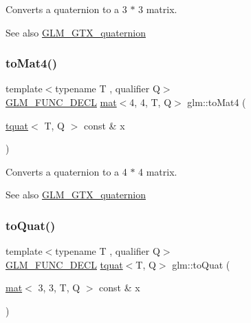 Converts a quaternion to a 3 $\ast$ 3 matrix.

\begin{DoxySeeAlso}{See also}
\hyperlink{group__gtx__quaternion}{G\+L\+M\+\_\+\+G\+T\+X\+\_\+quaternion} 
\end{DoxySeeAlso}
\mbox{\label{group__gtx__quaternion_ga1fa0fb798c2715148e2e0358442bf895}} 
\subsubsection{\texorpdfstring{to\+Mat4()}{toMat4()}}
{\footnotesize\ttfamily template$<$typename T , qualifier Q$>$ \\
\hyperlink{setup_8hpp_ab2d052de21a70539923e9bcbf6e83a51}{G\+L\+M\+\_\+\+F\+U\+N\+C\+\_\+\+D\+E\+CL} \hyperlink{structglm_1_1mat}{mat}$<$4, 4, T, Q$>$ glm\+::to\+Mat4 (\begin{DoxyParamCaption}\item[{\hyperlink{structglm_1_1tquat}{tquat}$<$ T, Q $>$ const \&}]{x }\end{DoxyParamCaption})}

Converts a quaternion to a 4 $\ast$ 4 matrix.

\begin{DoxySeeAlso}{See also}
\hyperlink{group__gtx__quaternion}{G\+L\+M\+\_\+\+G\+T\+X\+\_\+quaternion} 
\end{DoxySeeAlso}
\mbox{\label{group__gtx__quaternion_gae9be791077b7a612d9092a922bd13f86}} 
\subsubsection{\texorpdfstring{to\+Quat()}{toQuat()}\hspace{0.1cm}{\footnotesize\ttfamily [1/2]}}
{\footnotesize\ttfamily template$<$typename T , qualifier Q$>$ \\
\hyperlink{setup_8hpp_ab2d052de21a70539923e9bcbf6e83a51}{G\+L\+M\+\_\+\+F\+U\+N\+C\+\_\+\+D\+E\+CL} \hyperlink{structglm_1_1tquat}{tquat}$<$T, Q$>$ glm\+::to\+Quat (\begin{DoxyParamCaption}\item[{\hyperlink{structglm_1_1mat}{mat}$<$ 3, 3, T, Q $>$ const \&}]{x }\end{DoxyParamCaption})}

